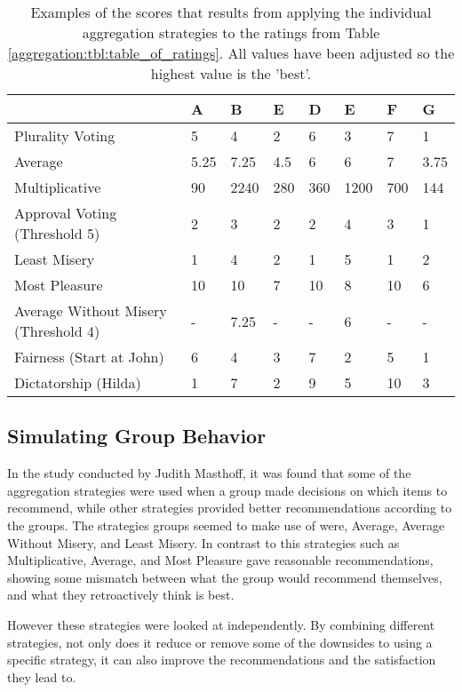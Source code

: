 \begin{table}[H]
	\centering
	\begin{tabular}{ | p{2.5cm} | p{1cm} | p{1cm} | p{1cm} | p{1cm} | p{1cm} | p{1cm} | p{1cm} | } \hline
		& \textbf{A} & \textbf{B} & \textbf{E} & \textbf{D} & \textbf{E} & \textbf{F} & \textbf{G}  \\ \hline
		Plurality Voting & 5 & 4 & 2 & 6 & 3 & 7 & 1 \\ \hline
		Average & 5.25 & 7.25 & 4.5 & 6 & 6 & 7 & 3.75 \\ \hline
		Multiplicative & 90 & 2240 & 280 & 360 & 1200 & 700 & 144 \\ \hline
		Approval Voting (Threshold 5) & 2 & 3 & 2 & 2 & 4 & 3 & 1 \\ \hline
		Least Misery & 1 & 4 & 2 & 1 & 5 & 1 & 2 \\ \hline
		Most Pleasure & 10 & 10 & 7 & 10 & 8 & 10 & 6 \\ \hline
		Average Without Misery (Threshold 4) & - & 7.25 & - & - & 6 & - & - \\ \hline
		Fairness (Start at John) & 6 & 4 & 3 & 7 & 2 & 5 & 1 \\ \hline
		Dictatorship (Hilda) & 1 & 7 & 2 & 9 & 5 & 10 & 3 \\ \hline
	\end{tabular}
	\caption{Examples of the scores that results from applying the individual aggregation strategies to the ratings from Table \ref{aggregation:tbl:table_of_ratings}. All values have been adjusted so the highest value is the 'best'. }
	\label{aggregation:tbl:examples_of_strategies}
\end{table}

\subsection{Simulating Group Behavior}
In the study conducted by Judith Masthoff, it was found that some of the aggregation strategies were used when a group made decisions on which items to recommend, while other strategies provided better recommendations according to the groups. The strategies groups seemed to make use of were, Average, Average Without Misery, and Least Misery. In contrast to this strategies such as Multiplicative, Average, and Most Pleasure gave reasonable recommendations, showing some mismatch between what the group would recommend themselves, and what they retroactively think is best.

However these strategies were looked at independently. By combining different strategies, not only does it reduce or remove some of the downsides to using a specific strategy, it can also improve the recommendations and the satisfaction they lead to.